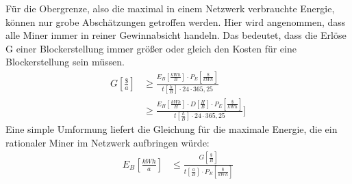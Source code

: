 Für die Obergrenze, also die maximal in einem Netzwerk verbrauchte Energie, können nur grobe Abschätzungen getroffen werden. Hier wird angenommen, dass alle Miner immer in reiner Gewinnabsicht handeln. Das bedeutet, dass die Erlöse G einer Blockerstellung immer größer oder gleich den Kosten für eine Blockerstellung sein müssen.
\begin{align*}
    G\left[\frac{\$}{a}\right]&\geq \frac{E_B\left[\frac{kWh}{B}\right]\cdot P_E\left[\frac{\$}{kWh}\right]}{t \left[\frac{h}{B}\right]\cdot 24\cdot 365,25}\\
    &\geq \frac{E_H\left[\frac{kWh}{H}\right]\cdot D\left[\frac{H}{B}\right]\cdot P_E\left[\frac{\$}{kWh}\right]}{t \left[\frac{h}{B}\right]\cdot 24\cdot 365,25}]
\end{align*}
Eine simple Umformung liefert die Gleichung für die maximale Energie, die ein rationaler Miner im Netzwerk aufbringen würde:
\begin{align*}
    E_B\left[\frac{kWh}{a}\right]&\leq\frac{G\left[\frac{\$}{B}\right]}{t \left[\frac{a}{B}\right]\cdot P_E\left[\frac{\$}{kWh}\right]}
\end{align*}